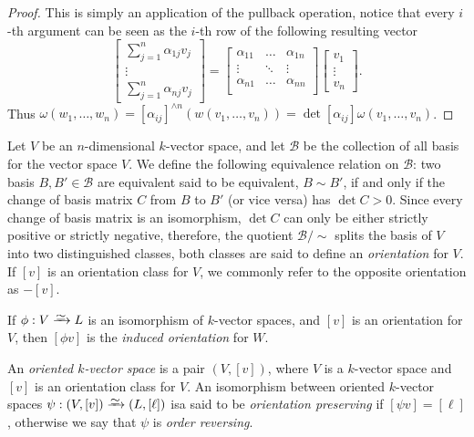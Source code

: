 \begin{proof}
    This is simply an application of the pullback operation, notice that every
    \(i\)-th argument can be seen as the \(i\)-th row of the following resulting
    vector
    \[
        \begin{bmatrix}
            \sum_{j=1}^n \alpha_{1 j} v_j \\ \vdots \\ \sum_{j=1}^n \alpha_{n j} v_j
        \end{bmatrix}
        =
        \begin{bmatrix}
            \alpha_{11} & \dots  & \alpha_{1n} \\
            \vdots      & \ddots & \vdots      \\
            \alpha_{n1} & \dots  & \alpha_{nn} \\
        \end{bmatrix}
        \begin{bmatrix}
            v_1 \\ \vdots \\ v_n
        \end{bmatrix}.
    \]
    Thus \(\omega(w_1, \dots, w_n) = [\alpha_{ij}]^{\wedge n}(w(v_{1}, \dots, v_n))
    = \det [\alpha_{ij}] \omega(v_1, \dots, v_n)\).
\end{proof}

\begin{definition}[Orientation]
    \label{def:orientation}
    Let \(V\) be an \(n\)-dimensional \(k\)-vector space, and let \(\mathcal B\) be
    the collection of all basis for the vector space \(V\). We define the following
    equivalence relation on \(\mathcal B\): two basis \(B, B' \in \mathcal B\) are
    equivalent said to be equivalent, \(B \sim B'\), if and only if the change of
    basis matrix \(C\) from \(B\) to \(B'\) (or vice versa) has \(\det C >
    0\). Since every change of basis matrix is an isomorphism, \(\det C\) can only
    be either strictly positive or strictly negative, therefore, the quotient
    \(\mathcal B/{\sim}\) splits the basis of \(V\) into two distinguished classes,
    both classes are said to define an \emph{orientation} for \(V\). If \([v]\) is
    an orientation class for \(V\), we commonly refer to the opposite orientation
    as \(-[v]\).

    If \(\phi: V \isoto L\) is an isomorphism of \(k\)-vector spaces, and \([v]\) is
    an orientation for \(V\), then \([\phi v]\) is the \emph{induced orientation}
    for \(W\).

    An \emph{oriented \(k\)-vector space} is a pair \((V, [v])\), where \(V\) is a
    \(k\)-vector space and \([v]\) is an orientation class for \(V\). An isomorphism
    between oriented \(k\)-vector spaces \(\psi: (V, [v]) \isoto (L, [\ell])\) isa
    said to be \emph{orientation preserving} if \([\psi v] = [\ell]\), otherwise we
    say that \(\psi\) is \emph{order reversing}.
\end{definition}

